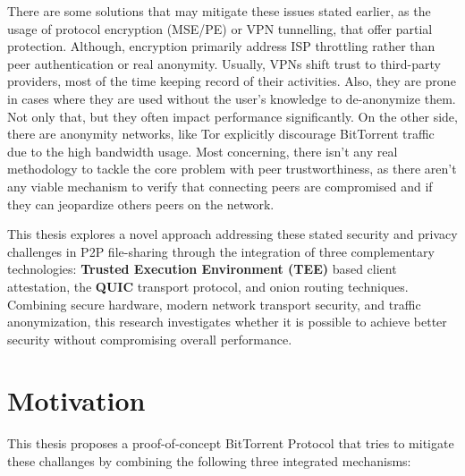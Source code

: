 There are some solutions that may mitigate these issues stated earlier, as the usage of protocol encryption (MSE/PE) or VPN tunnelling, that offer partial protection. Although, encryption primarily address ISP throttling rather than peer authentication or real anonymity. Usually, VPNs shift trust to third-party providers, most of the time keeping record of their activities. Also, they are prone in cases where they are used without the user's knowledge to de-anonymize them. Not only that, but they often impact performance significantly. On the other side, there are anonymity networks, like Tor explicitly discourage BitTorrent traffic due to the high bandwidth usage. Most concerning, there isn't any real methodology to tackle the core problem with peer trustworthiness, as there aren't any viable mechanism to verify that connecting peers are compromised and if they can jeopardize others peers on the network.

This thesis explores a novel approach addressing these stated security and privacy challenges in P2P file-sharing through the integration of three complementary technologies: \textbf{Trusted Execution Environment (TEE)} based client attestation, the \textbf{QUIC} transport protocol, and onion routing techniques. Combining secure hardware, modern network transport security, and traffic anonymization, this research investigates whether it is possible to achieve better security without compromising overall performance.

\section{Motivation}
This thesis proposes a proof-of-concept BitTorrent Protocol that tries to mitigate these challanges by combining the following three integrated mechanisms:

